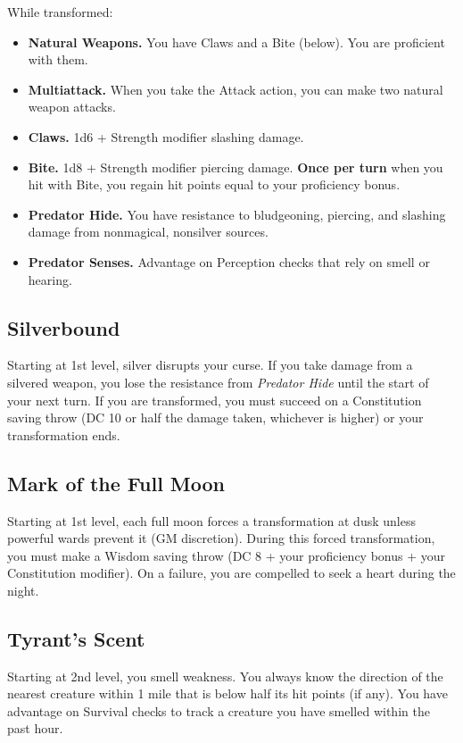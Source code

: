 \documentclass[letterpaper,twocolumn,openany,nodeprecatedcode,breakable,skins,xparse,most]{dndbook}
\begin{document}
While transformed:
\begin{itemize}
\item \textbf{Natural Weapons.} You have Claws and a Bite (below). You are proficient with them.
\item \textbf{Multiattack.} When you take the Attack action, you can make two natural weapon attacks.
\item \textbf{Claws.} 1d6 + Strength modifier slashing damage.
\item \textbf{Bite.} 1d8 + Strength modifier piercing damage. \textbf{Once per turn} when you hit with Bite, you regain hit points equal to your proficiency bonus.
\item \textbf{Predator Hide.} You have resistance to bludgeoning, piercing, and slashing damage from nonmagical, nonsilver sources.
\item \textbf{Predator Senses.} Advantage on Perception checks that rely on smell or hearing.
\end{itemize}

\subsection*{Silverbound}
Starting at 1st level, silver disrupts your curse. If you take damage from a silvered weapon, you lose the resistance from \emph{Predator Hide} until the start of your next turn. If you are transformed, you must succeed on a Constitution saving throw (DC 10 or half the damage taken, whichever is higher) or your transformation ends.

\subsection*{Mark of the Full Moon}
Starting at 1st level, each full moon forces a transformation at dusk unless powerful wards prevent it (GM discretion). During this forced transformation, you must make a Wisdom saving throw (DC 8 + your proficiency bonus + your Constitution modifier). On a failure, you are compelled to seek a heart during the night.

\subsection*{Tyrant's Scent}
Starting at 2nd level, you smell weakness. You always know the direction of the nearest creature within 1 mile that is below half its hit points (if any). You have advantage on Survival checks to track a creature you have smelled within the past hour.
\end{document}
